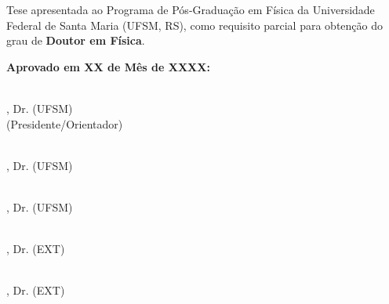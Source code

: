 \begin{folhadeaprovacao}
\center
\begingroup
    \fontsize{12pt}{12pt}\selectfont
    \textbf{\imprimirautor}
\endgroup
\vspace{7em}

\begingroup
    \fontsize{12pt}{12pt}\selectfont
    \textbf{\expandafter\MakeUppercase\expandafter{\imprimirtitulo}}
\endgroup
\vspace{7em}
%
%
\begin{flushright}
\begin{minipage}{.50\textwidth}Tese apresentada ao Programa de Pós-Graduação em Física da Universidade Federal de Santa Maria (UFSM, RS), como requisito parcial para obtenção do grau de \textbf{Doutor em Física}.
\end{minipage}
\end{flushright}
\vspace{4em}


\textbf{Aprovado em XX de Mês de XXXX:}
\vspace{48pt}


\makebox[8cm]{\hrulefill}\\
, Dr. (UFSM)\\
(Presidente/Orientador)
\vspace{1.5em}

\makebox[8cm]{\hrulefill}\\

, Dr. (UFSM)
\vspace{1.5em}

\makebox[8cm]{\hrulefill}\\
, Dr. (UFSM)
\vspace{1.5em}

\makebox[8cm]{\hrulefill}\\

, Dr. (EXT)
\vspace{1.5em}

\makebox[8cm]{\hrulefill}\\
, Dr. (EXT)

\vfill

\begingroup
    \fontsize{12pt}{12pt}\selectfont
    \imprimirlocal\\
    \imprimirdata
\endgroup

\end{folhadeaprovacao}
